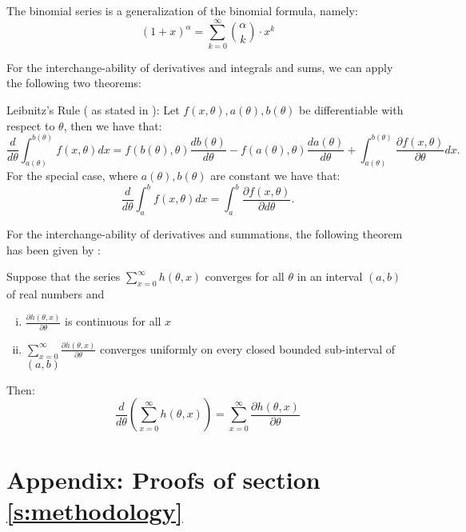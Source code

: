 \begin{definition}\label{d: binomial}
    The binomial series is a generalization of the binomial formula, namely:
    \[(1 + x)^\alpha = \sum_{k = 0}^{\infty}\binom{\alpha}{k} \cdot x^k\]
\end{definition}

For the interchange-ability of derivatives and integrals and sums, we can apply the following two theorems:

\begin{theorem}\label{thm:leibnitz}
    Leibnitz's Rule ( as stated in \citet{flanders1973}):
    Let \(f(x, \theta), a(\theta), b(\theta)\) be differentiable with respect to \(\theta\), then we have that:
    \[ \frac{d}{d\theta} \int_{a(\theta)}^{b(\theta)} f(x, \theta) dx = f(b(\theta), \theta) \frac{d b(\theta)}{d\theta} - f(a(\theta), \theta) \frac{d a(\theta)}{d\theta} + \int_{a(\theta)}^{b(\theta)} \frac{\partial f(x, \theta) }{\partial \theta} dx.\] For the special case, where \(a(\theta), b(\theta)\) are constant we have that: 
    \[\frac{d}{d\theta} \int_{a}^{b} f(x, \theta) dx =  \int_{a}^{b} \frac{ \partial f(x, \theta)}{ \partial d\theta}.\]
\end{theorem}

For the interchange-ability of derivatives and summations, the following theorem has been given by \citet{casella2002}:
\begin{theorem}\label{thm:casella}
    Suppose that the series \(\sum_{x = 0}^{\infty} h(\theta, x)\) converges for all \(\theta\) in an interval \((a, b)\) of real numbers and 
    
    \begin{enumerate}[(i)]
        \item \(\frac{\partial h(\theta, x)}{\partial \theta}\) is continuous for all \(x\)
        \item \(\sum_{x = 0}^{\infty} \frac{\partial h(\theta, x)}{\partial \theta}\) converges uniformly on every closed bounded sub-interval of \((a, b)\)
    \end{enumerate}
    Then:
    \[
    \frac{d}{d \theta} \left( \sum_{x = 0}^{\infty} h(\theta, x) \right) = \sum_{x = 0}^{\infty} \frac{\partial h(\theta, x)}{\partial \theta}
    \]
    
   
\end{theorem}


\clearpage
\section{Appendix: Proofs of section \ref{s:methodology}}\label{s:app_B}

